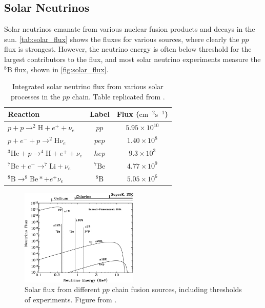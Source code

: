 \subsection{Solar Neutrinos}
Solar neutrinos emanate from various nuclear fusion products and decays in the sun. \autoref{tab:solar_flux} shows the fluxes for various sources, where clearly the $pp$ flux is strongest. However, the neutrino energy is often below threshold for the largest contributors to the flux, and most solar neutrino experiments measure the $^{8}\text{B}$ flux, shown in \autoref{fig:solar_flux}.
\begin{table}[h]
	\begin{tabular}{l | c c}
		\hline
		\hline
		Reaction & Label & Flux ($\text{cm}^{-2} \text{s}^{-1}$) \\
		\hline
		$p+p\rightarrow ^{2}\text{H} + e^+ + \nu_e$ & $pp$ & $5.95\times10^{10}$ \\
		$p+e^-+p\rightarrow ^{2}\text{H} \nu_e$ & $pep$ & $1.40\times10^{8}$ \\
		$^{3}\text{He} + p\rightarrow ^{4}\text{H} + e^+ + \nu_e$ & $hep$ & $9.3\times10^{3}$ \\
		$^{7}\text{Be} + e^- \rightarrow ^{7}\text{Li} + \nu_e$ & $^{7}\text{Be}$ & $4.77\times10^{9}$ \\
		$^{8}\text{B} \rightarrow ^{8}\text{Be}* + e^+ \nu_e$ & $^{8}\text{B}$ & $5.05\times10^{6}$ \\
		\hline
		\hline
	\end{tabular}
	\caption{Integrated solar neutrino flux from various solar processes in the $pp$ chain. Table replicated from \cite{solar_review}.}
	\label{tab:solar_flux}
\end{table}

\begin{figure}[h]
	\includegraphics[width=0.5\textwidth, trim={0mm 0mm 0mm 0mm}, clip,page=1]{figures/theory/solar_flux}
	\caption{Solar flux from different $pp$ chain fusion sources, including thresholds of experiments. Figure from \cite{sno_solar_flux}.}
	\label{fig:solar_flux}
\end{figure}

